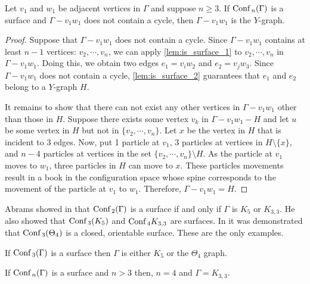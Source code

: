 \begin{lem}
Let \(v_1\) and \(w_1\) be adjacent vertices in \(\Gamma\) and suppose \(n \ge 3\).
If \(\text{Conf}\,_n(\Gamma)\) is a surface and \(\Gamma - v_1 w_1\) does not contain a cycle, then \(\Gamma - v_1 w_1\) is the \(Y\)-graph.
\end{lem}
\begin{proof}
Suppose that \(\Gamma - v_1 w_1\) does not contain a cycle.
Since \(\Gamma - v_1 w_1\) contains at least \(n - 1\) vertices: \(v_2, \cdots, v_n\), 
we can apply \ref{lem:is_surface_1} to \(v_2, \cdots, v_n\) in \(\Gamma - v_1 w_1\).
Doing this, we obtain two edges \(e_1 = v_i w_2\) and \(e_2 = v_j w_3\).
Since \(\Gamma - v_1 w_1\) does not contain a cycle, \ref{lem:is_surface_2} guarantees that
\(e_1\) and \(e_2\) belong to a \(Y\)-graph \(H\).

It remains to show that there can not exist any other vertices in \(\Gamma - v_1 w_1\) other than those in \(H\).
Suppose there exists some vertex \(v_k\) in \(\Gamma - v_1 w_1 - H\) and let \(u\) be some vertex in \(H\) but not in \(\{v_2, \cdots, v_n\}\).
Let \(x\) be the vertex in \(H\) that is incident to \(3\) edges.
Now, put 1 particle at \(v_1\), \(3\) particles at vertices in \(H \setminus \{x\}\),
and \(n-4\) particles at vertices in the set \(\{v_2, \cdots, v_n\}\setminus H\).
As the particle at \(v_1\) moves to \(w_1\),
three particles in \(H\) can move to \(x\).
These particles movements result in a book in the configuration space whose spine
corresponds to the movement of the particle at \(v_1\) to \(w_1\).
Therefore, \(\Gamma - v_1 w_1 = H\).
\end{proof}

Abrams showed in \cite{abrams2000configurationspaces} that \(\text{Conf}\,_2(\Gamma)\) is a surface if and only if \(\Gamma\) is \(K_5\) or \(K_{3,3}\).
He also showed that \(\text{Conf}\,_3(K_5)\) and \(\text{Conf}\,_4{K_{3,3}}\) are surfaces.
In \cite{appiah2024algebraicstructurehyperbolicgraph} it was demonstrated that \(\text{Conf}\,_3(\Theta_4)\) is a closed, orientable surface.
These are the only examples.

\begin{thm}
    If \(\text{Conf}\,_3(\Gamma)\) is a surface then \(\Gamma\) is either \(K_5\) or the \(\Theta_4\) graph.
\end{thm}

\begin{thm}
    If \(\text{Conf}\,_n(\Gamma)\) is a surface and \(n > 3\) then, \(n = 4\) and \(\Gamma = K_{3,3}\).
\end{thm}
